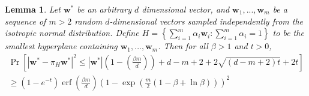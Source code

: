 \documentclass{article}
\newtheorem{lemma}{Lemma}
\theoremstyle{definition}
\DeclareMathOperator*{\erf}{erf}
\DeclareMathOperator*{\probop}{Pr}
\newcommand{\prob}[1]{\ensuremath{\probop\left[{#1}\right]}}
\newcommand{\proj}[1]{\ensuremath{\pi}_{#1}}
\newcommand{\w}{\mathbf{w}}
\newcommand{\normal}[2]{\ensuremath{\mathcal{N}\left({{#1}},{{#2}}\right)}}
\begin{document}
\begin{lemma}
Let $\w^*$ be an arbitrary $d$ dimensional vector,
and $\w_1,...,\w_m$ be a sequence of $m>2$ random $d$-dimensional vectors sampled independently from the isotropic normal distribution.
Define $H= \left\{\sum_{i=1}^m \alpha_i\w_i : \sum_{i=1}^m\alpha_i = 1 \right\}$ to be the smallest hyperplane containing $\w_1,...,\w_m$.
Then for all $\beta>1$ and $t>0$,
\begin{multline}
\prob{
    |\w^*-\proj{H}\w^*|^2 \le
    |\w^*|\left(1-\left(\frac{\beta m}{d}\right)\right)
    +
    d - m + 2 + 2\sqrt{(d - m + 2)t} + 2t
}
\\
\ge
(1-e^{-t})
\erf\left(\frac{\beta m}{d}\right)
\left(1 - \exp\left(\frac{m}{2}(1-\beta+\ln\beta)\right)\right)^2
\end{multline}
\end{lemma}
\end{document}

